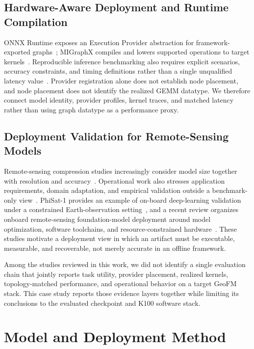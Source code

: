 \documentclass[conference]{IEEEtran}
\begin{document}
\subsection{Hardware-Aware Deployment and Runtime Compilation}

ONNX Runtime exposes an Execution Provider abstraction for framework-exported graphs~\cite{onnxruntime}; MIGraphX compiles and lowers supported operations to target kernels~\cite{migraphx}. Reproducible inference benchmarking also requires explicit scenarios, accuracy constraints, and timing definitions rather than a single unqualified latency value~\cite{mlperf2020}. Provider registration alone does not establish node placement, and node placement does not identify the realized GEMM datatype. We therefore connect model identity, provider profiles, kernel traces, and matched latency rather than using graph datatype as a performance proxy.

\subsection{Deployment Validation for Remote-Sensing Models}

Remote-sensing compression studies increasingly consider model size together with resolution and accuracy~\cite{shinde2025}. Operational work also stresses application requirements, domain adaptation, and empirical validation outside a benchmark-only view~\cite{worldcereal2025}. PhiSat-1 provides an example of on-board deep-learning validation under a constrained Earth-observation setting~\cite{phisat2022}, and a recent review organizes onboard remote-sensing foundation-model deployment around model optimization, software toolchains, and resource-constrained hardware~\cite{sang2026}. These studies motivate a deployment view in which an artifact must be executable, measurable, and recoverable, not merely accurate in an offline framework.

Among the studies reviewed in this work, we did not identify a single evaluation chain that jointly reports task utility, provider placement, realized kernels, topology-matched performance, and operational behavior on a target GeoFM stack. This case study reports those evidence layers together while limiting its conclusions to the evaluated checkpoint and K100 software stack.

\section{Model and Deployment Method}
\label{sec:method}
\end{document}
